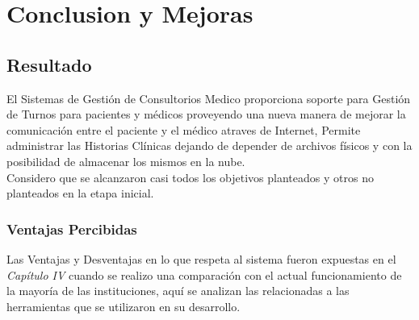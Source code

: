 ﻿\chapter{Conclusion y Mejoras}


\section{Resultado}

El Sistemas de Gestión de Consultorios Medico proporciona soporte para Gestión de Turnos para pacientes y médicos proveyendo una nueva manera de mejorar la comunicación entre el paciente y el médico atraves de Internet, Permite administrar las Historias Clínicas dejando de depender de archivos físicos y con la posibilidad de almacenar los mismos en la nube.\\[0.1cm]

Considero que se alcanzaron casi todos los objetivos planteados y otros no planteados en la etapa inicial.


\subsection{Ventajas Percibidas}

Las Ventajas y Desventajas en lo que respeta al sistema fueron expuestas en el \textit{Capítulo IV} cuando se realizo una comparación con el actual funcionamiento de la mayoría de las instituciones, aquí se analizan las relacionadas a las herramientas que se utilizaron en su desarrollo.


